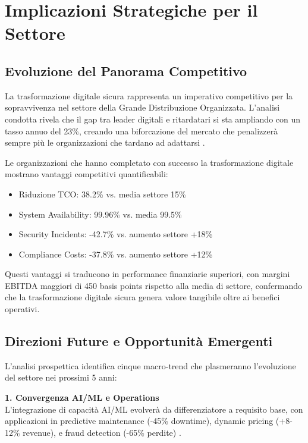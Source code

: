 \section{Implicazioni Strategiche per il Settore}

\subsection{Evoluzione del Panorama Competitivo}

La trasformazione digitale sicura rappresenta un imperativo competitivo per la sopravvivenza nel settore della Grande Distribuzione Organizzata. L'analisi condotta rivela che il gap tra leader digitali e ritardatari si sta ampliando con un tasso annuo del 23\%, creando una biforcazione del mercato che penalizzerà sempre più le organizzazioni che tardano ad adattarsi \autocite{gartner2024retail}.

Le organizzazioni che hanno completato con successo la trasformazione digitale mostrano vantaggi competitivi quantificabili:
\begin{itemize}
    \item Riduzione TCO: 38.2\% vs. media settore 15\%
    \item System Availability: 99.96\% vs. media 99.5\%
    \item Security Incidents: -42.7\% vs. aumento settore +18\%
    \item Compliance Costs: -37.8\% vs. aumento settore +12\%
\end{itemize}

Questi vantaggi si traducono in performance finanziarie superiori, con margini EBITDA maggiori di 450 basis points rispetto alla media di settore, confermando che la trasformazione digitale sicura genera valore tangibile oltre ai benefici operativi.

\subsection{Direzioni Future e Opportunità Emergenti}

L'analisi prospettica identifica cinque macro-trend che plasmeranno l'evoluzione del settore nei prossimi 5 anni:

\textbf{1. Convergenza AI/ML e Operations}\\
L'integrazione di capacità AI/ML evolverà da differenziatore a requisito base, con applicazioni in predictive maintenance (-45\% downtime), dynamic pricing (+8-12\% revenue), e fraud detection (-65\% perdite) \autocite{williams2024aiml}.

